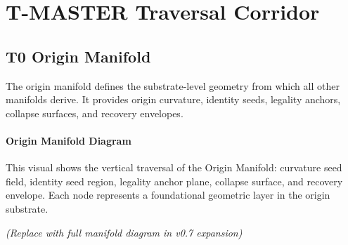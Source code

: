 
\section{T-MASTER Traversal Corridor}

\subsection{T0 Origin Manifold}
The origin manifold defines the substrate-level geometry from which all other
manifolds derive. It provides origin curvature, identity seeds, legality
anchors, collapse surfaces, and recovery envelopes.

\paragraph{Origin Manifold Diagram}
This visual shows the vertical traversal of the Origin Manifold: curvature seed
field, identity seed region, legality anchor plane, collapse surface, and
recovery envelope. Each node represents a foundational geometric layer in the
origin substrate.


\begin{center}

\vspace{8pt}
\textit{(Replace with full manifold diagram in v0.7 expansion)}
\end{center}





